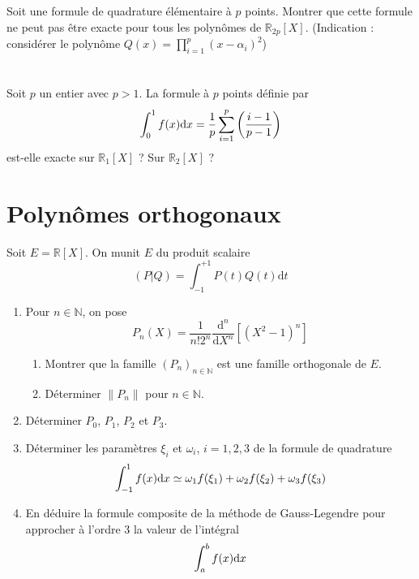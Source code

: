 \documentclass[a4paper]{article}
\def \de {{\rm d}}
\begin{document}
\section{} Soit une formule de quadrature élémentaire à $p$ points. Montrer que cette formule ne peut pas être exacte pour tous les polynômes de $\mathbb{R}_{2p}[X]$.
(Indication : considérer le polynôme $Q(x) =\prod_{i=1}^p(x-\alpha_i)^2$)



\section{} Soit $p$ un entier avec $p > 1$.
La formule à $p$ points définie par
\[\int_{0}^1f(x)\de x=\frac 1p\sum_{i=1}^p\left(\frac{i-1}{p-1}\right)\]
est-elle exacte sur $\mathbb{R}_{1}[X]$ ? Sur $\mathbb{R}_{2}[X]$ ?

\section{Polynômes orthogonaux}
Soit $E = \mathbb{R}[X]$. On munit $E$ du produit scalaire 
\[(P|Q) = \int_{-1}^{+1} P(t)Q(t) \mbox{d}t\]

\begin{enumerate}
\item  Pour $n\in \mathbb{N}$, on pose 
\[P_n(X) =\frac 1{n! 2^n}\frac{\mbox{d}^n}{\mbox{d}X^n}\left[\left(X^2-1\right)^n\right]\]

\begin{enumerate}
\item  Montrer que la famille $(P_n)_{n\in \mathbb{N}}$ est une famille orthogonale de $E$.
\item  Déterminer $\|P_n\|$ pour $n\in \mathbb{N}$.
\end{enumerate}
\item   Déterminer $P_0$, $P_1$, $P_2$ et $P_3$.
\item Déterminer les paramètres $\xi_i$ et $\omega_i$, $i=1,2,3$ de la formule de quadrature
\[\int_{-1}^1f(x)\de x \simeq \omega_1f(\xi_1)+\omega_2f(\xi_2)+\omega_3f(\xi_3)\]
\item En déduire la formule composite de la méthode de Gauss-Legendre pour approcher à l'ordre 3  la valeur de l'intégral \[\int_{a}^bf(x)\de x\]

\end{enumerate}
\end{document}
